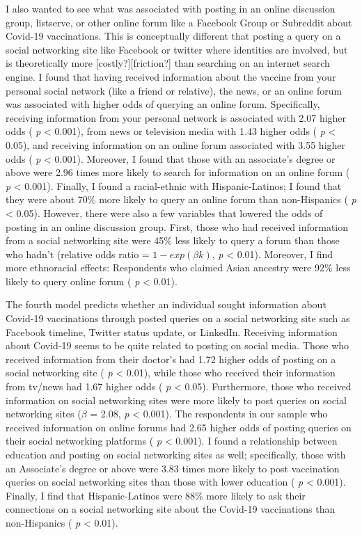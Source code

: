I also wanted to see what was associated with posting in an online discussion
group, listserve, or other online forum like a Facebook Group or Subreddit about
Covid-19 vaccinations. This is conceptually different that posting a query on a
social networking site like Facebook or twitter where identities are involved,
but is theoretically more {[}costly?{]}{[}friction?{]} than searching on an internet
search engine. I found that having received information about the vaccine from
your personal social network (like a friend or relative), the news, or an online
forum was associated with higher odds of querying an online forum. Specifically,
receiving information from your personal network is associated with 2.07
higher odds ( \emph{p} \textless{} 0.001), from news or television media with 1.43 higher odds ( \emph{p} \textless{} 0.05), and receiving information on an online forum associated with 3.55
higher odds ( \emph{p} \textless{} 0.001). Moreover, I found that those with an associate's
degree or above were 2.96 times 
more likely to search for information on an online forum ( \emph{p} \textless{} 0.001). Finally,
I found a racial-ethnic with Hispanic-Latinos; I found that they were about 70\%
more likely to query an online forum than non-Hispanics ( \emph{p} \textless{} 0.05). However,
there were also a few variables that lowered the odds of posting in an online
discussion group. First, those who had received information from a social networking site were 45\%
less likely to query a forum than those who hadn't (relative odds ratio =
\(1 - exp(\beta k)\), \emph{p} \textless{} 0.01). Moreover, I find more ethnoracial effects:
Respondents who claimed Asian ancestry were 92\%
less likely to query online forum ( \emph{p} \textless{} 0.01).

The fourth model predicts whether an individual sought information about
Covid-19 vaccinations through posted queries on a social networking site such
as Facebook timeline, Twitter status update, or LinkedIn. Receiving information
about Covid-19 seems to be quite related to posting on social media. Those who
received information from their doctor's had 1.72
higher odds of posting on a social networking site ( \emph{p} \textless{} 0.01), while those
who received their information from tv/news had 1.67 higher odds ( \emph{p} \textless{} 0.05).
Furthermore, those who received information on social networking sites were more
likely to post queries on social networking sites (\(\beta\) = 2.08, \emph{p} \textless{} 0.001).
The respondents in our sample who received information on online forums had 2.65
higher odds of posting queries on their social networking platforms ( \emph{p} \textless{} 0.001).
I found a relationship between education and posting on social networking sites
as well; specifically, those with an Associate's degree or above were 3.83 times more likely to post vaccination
queries on social networking sites than those with lower education ( \emph{p} \textless{} 0.001).
Finally, I find that Hispanic-Latinos were 88\%
more likely to ask their connections on a social networking site about the
Covid-19 vaccinations than non-Hispanics ( \emph{p} \textless{} 0.01).

